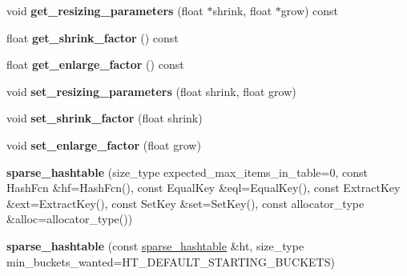 \begin{DoxyCompactItemize}
\item 
void {\bfseries get\+\_\+resizing\+\_\+parameters} (float $\ast$shrink, float $\ast$grow) const \hypertarget{classspp___1_1sparse__hashtable_aae193ec101e1ccca1b6c93ea148fcd2d}{}\label{classspp___1_1sparse__hashtable_aae193ec101e1ccca1b6c93ea148fcd2d}

\item 
float {\bfseries get\+\_\+shrink\+\_\+factor} () const \hypertarget{classspp___1_1sparse__hashtable_ade4f2ded3b224f2a40bfb68b0d357022}{}\label{classspp___1_1sparse__hashtable_ade4f2ded3b224f2a40bfb68b0d357022}

\item 
float {\bfseries get\+\_\+enlarge\+\_\+factor} () const \hypertarget{classspp___1_1sparse__hashtable_a74633918fd9cc03ef037d31c97a462b7}{}\label{classspp___1_1sparse__hashtable_a74633918fd9cc03ef037d31c97a462b7}

\item 
void {\bfseries set\+\_\+resizing\+\_\+parameters} (float shrink, float grow)\hypertarget{classspp___1_1sparse__hashtable_aa7e8af589668e14f40d7737f5acd98d2}{}\label{classspp___1_1sparse__hashtable_aa7e8af589668e14f40d7737f5acd98d2}

\item 
void {\bfseries set\+\_\+shrink\+\_\+factor} (float shrink)\hypertarget{classspp___1_1sparse__hashtable_ad982fbf2da9b9e68c021f6d7d7d9ca68}{}\label{classspp___1_1sparse__hashtable_ad982fbf2da9b9e68c021f6d7d7d9ca68}

\item 
void {\bfseries set\+\_\+enlarge\+\_\+factor} (float grow)\hypertarget{classspp___1_1sparse__hashtable_a1b7393c281085b896eb9970af7e8329a}{}\label{classspp___1_1sparse__hashtable_a1b7393c281085b896eb9970af7e8329a}

\item 
{\bfseries sparse\+\_\+hashtable} (size\+\_\+type expected\+\_\+max\+\_\+items\+\_\+in\+\_\+table=0, const Hash\+Fcn \&hf=Hash\+Fcn(), const Equal\+Key \&eql=Equal\+Key(), const Extract\+Key \&ext=Extract\+Key(), const Set\+Key \&set=Set\+Key(), const allocator\+\_\+type \&alloc=allocator\+\_\+type())\hypertarget{classspp___1_1sparse__hashtable_a4a6ca4399a10f2e8b580b122ef613182}{}\label{classspp___1_1sparse__hashtable_a4a6ca4399a10f2e8b580b122ef613182}

\item 
{\bfseries sparse\+\_\+hashtable} (const \hyperlink{classspp___1_1sparse__hashtable}{sparse\+\_\+hashtable} \&ht, size\+\_\+type min\+\_\+buckets\+\_\+wanted=H\+T\+\_\+\+D\+E\+F\+A\+U\+L\+T\+\_\+\+S\+T\+A\+R\+T\+I\+N\+G\+\_\+\+B\+U\+C\+K\+E\+TS)\hypertarget{classspp___1_1sparse__hashtable_ade13ba50ff24a1223347689a2e3feba5}{}\label{classspp___1_1sparse__hashtable_ade13ba50ff24a1223347689a2e3feba5}


\end{DoxyCompactItemize}
